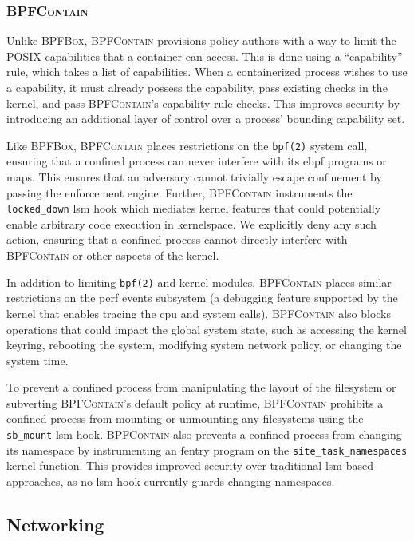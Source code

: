 \documentclass[
  fontsize=12pt,
  titlepage=firstiscover,
  paper=letter,
oneside,
  cleardoublepage=plain,
  parskip=half-,
  DIV=10,
  parindent,
  appendixprefix,
  chapterprefix,
  listof=totoc,
]{scrbook}
\newcommand{\bpfbox}{\textsc{BPFBox}}
\newcommand{\bpfcontain}{\textsc{BPFContain}}
\begin{document}
\subsubsection{\bpfcontain{}}

Unlike \bpfbox{}, \bpfcontain{} provisions policy authors with a way to limit the POSIX
capabilities that a container can access. This is done using a \enquote{capability} rule,
which takes a list of capabilities. When a containerized process wishes to use
a capability, it must already possess the capability, pass existing checks in the kernel,
and pass \bpfcontain{}'s capability rule checks. This improves security by introducing an
additional layer of control over a process' bounding capability set.

Like \bpfbox{}, \bpfcontain{} places restrictions on the \texttt{bpf(2)} system call,
ensuring that a confined process can never interfere with its \gls{ebpf} programs or maps.
This ensures that an adversary cannot trivially escape confinement by passing the
enforcement engine. Further, \bpfcontain{} instruments the \texttt{locked\_down} \gls{lsm}
hook which mediates kernel features that could potentially enable arbitrary code execution
in kernelspace.  We explicitly deny any such action, ensuring that a confined process
cannot directly interfere with \bpfcontain{} or other aspects of the kernel.

In addition to limiting \texttt{bpf(2)} and kernel modules, \bpfcontain{} places similar
restrictions on the perf events subsystem (a debugging feature supported by the kernel
that enables tracing the \gls{cpu} and system calls). \bpfcontain{} also blocks operations
that could impact the global system state, such as accessing the kernel keyring, rebooting
the system, modifying system network policy, or changing the system time.

To prevent a confined process from manipulating the layout of the filesystem or subverting
\bpfcontain{}'s default policy at runtime, \bpfcontain{} prohibits a confined process from
mounting or unmounting any filesystems using the \texttt{sb\_mount} \gls{lsm} hook.
\bpfcontain{} also prevents a confined process from changing its namespace by
instrumenting an fentry program on the \texttt{site\_task\_namespaces} kernel function.
This provides improved security over traditional \gls{lsm}-based approaches, as no
\gls{lsm} hook currently guards changing namespaces.

\subsection{Networking}
\end{document}
